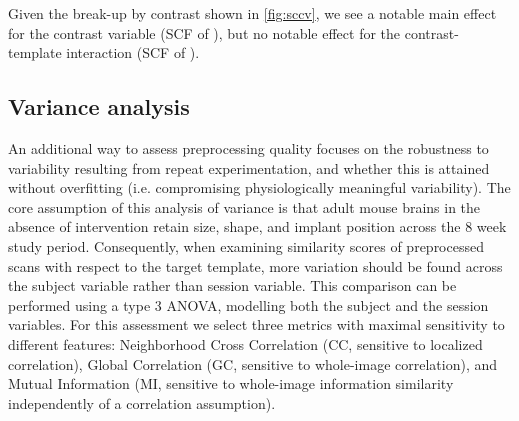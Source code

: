 Given the break-up by contrast shown in \cref{fig:sccv}, we see a notable main effect for the contrast variable
(SCF of ),
but no notable effect for the contrast-template interaction 
(SCF of ).


\subsection{Variance analysis}

\begin{sansmath}
\end{sansmath}

An additional way to assess preprocessing quality focuses on the robustness to variability resulting from repeat experimentation, and whether this is attained without overfitting (i.e. compromising physiologically meaningful variability).
The core assumption of this analysis of variance is that adult mouse brains in the absence of intervention retain size, shape, and implant position across the 8 week study period.
Consequently, when examining similarity scores of preprocessed scans with respect to the target template, more variation should be found across the subject variable rather than session variable.
This comparison can be performed using a type 3 ANOVA, modelling both the subject and the session variables.
For this assessment we select three metrics with maximal sensitivity to different features:
Neighborhood Cross Correlation (CC, sensitive to localized correlation),
Global Correlation (GC, sensitive to whole-image correlation),
and Mutual Information (MI, sensitive to whole-image information similarity independently of a correlation assumption).

